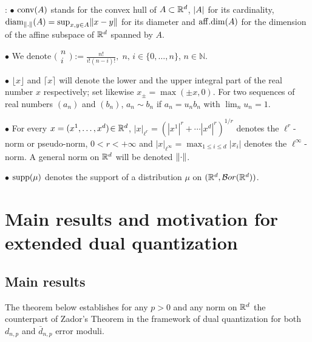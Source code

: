 \smallskip
{}:  $\bullet$ $\operatorname{conv}(A)$ stands for the convex hull of $A\subset \mathbb{R}^d$,
$\lvert A\rvert$ for its cardinality, ${\rm diam}_{\lVert.\rVert}(A)=\sup_{x,y\in A}\lVert x-y\rVert$ for its diameter and ${\rm aff.dim}(A)$ for the dimension of the affine subspace of $\mathbb{R}^d$ spanned by $A$. 

\noindent  $\bullet$ We denote 
$ \big(\begin{smallmatrix} n\\ i \end{smallmatrix}\big):=\frac{n!}{i!(n-i)!}, \; n,\, i\!\in \{0,\ldots,n\}$, $n\!\in \mathbb N$.
 
\noindent $\bullet$ $\lfloor x \rfloor$ and $\lceil x\rceil$ will denote the lower and the upper
integral part of the real number $x$ respectively; set likewise
$x_{\pm}=\max(\pm x,0)$.  For two
sequences of real numbers $(a_n)$ and $(b_n)$,  $a_n\sim b_n$ if $a_n =u_n b_n$ with $\lim_n u_n =1$.

\noindent $\bullet$  For every $x=(x^1,\ldots,x^d)\!\in \mathbb{R}^d$, $|x|_{\ell^r}=(|x^1|^r
+\cdots|x^d|^r)^{1/r}$ denotes the $\ell^r$-norm or pseudo-norm, $0<r<+\infty$  and $|x|_{\ell^{\infty}}=\max_{1\le i\le d}|x_i|$ denotes the $\ell^{\infty}$-norm. A general norm on $\mathbb{R}^d$ will be denoted $\lVert\cdot\rVert$.
 
\noindent $\bullet$ ${\rm supp}(\mu)$ denotes the support of a distribution $\mu$ on $(\mathbb{R}^d,{\cal B}or(\mathbb{R}^d))$. 

\section{Main results and motivation for extended dual quantization}
\subsection{Main results}\label{mains} 
The theorem below establishes  for any $p>0$ and any norm on $\mathbb{R}^d$
the counterpart of Zador's Theorem in the framework of dual quantization for both
$d_{n,p}$ and $\bar d_{n,p}$   error moduli.

